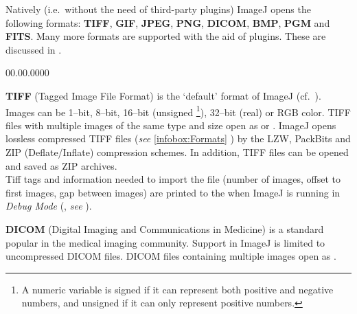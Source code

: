 Natively (i.e.\ without the need of third-party plugins) ImageJ opens
the following formats: \textbf{TIFF},
\textbf{GIF}, \textbf{JPEG},
\textbf{PNG}, \textbf{DICOM},
\textbf{BMP},
\textbf{PGM} and \textbf{FITS}.
Many more formats are supported with
the aid of plugins. These are discussed in .
\begin{lyxlist}{00.00.0000}
\item [{\textbf{TIFF}}] (Tagged Image File Format) is the `default' format
of ImageJ (cf.\ \textsf{}).
Images can be 1--bit, 8--bit, 16--bit (unsigned%
\footnote{A numeric variable is signed if it can represent both positive and
negative numbers, and unsigned if it can only represent positive numbers.%
}), 32--bit (real) or RGB color. TIFF files with multiple
images of the same type and size open as 
or . ImageJ opens lossless
compressed TIFF files (\emph{see} \ref{infobox:Formats} )
by the LZW,
PackBits and ZIP
(Deflate/Inflate) \cite{C-ZIPcompressedTIFFs}
compression schemes. In addition, TIFF files can be opened and saved
as ZIP archives.\\
Tiff tags and information needed to import the file (number of images,
offset to first images, gap between images) are printed to the 
when ImageJ is running in \emph{Debug Mode} (,
\emph{see} ).
\item [{\textbf{DICOM}}] (Digital Imaging and Communications in Medicine)
is a standard popular in the medical imaging community. Support in
ImageJ is limited to uncompressed DICOM files. DICOM
files containing multiple images open as .\\

\end{lyxlist}
